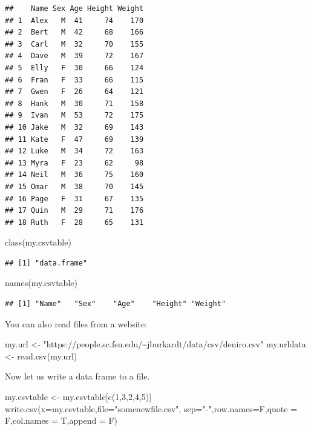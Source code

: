 \documentclass[
]{article}
\newenvironment{Shaded}{\begin{snugshade}}{\end{snugshade}}
\newcommand{\AttributeTok}[1]{\textcolor[rgb]{0.77,0.63,0.00}{#1}}
\newcommand{\DecValTok}[1]{\textcolor[rgb]{0.00,0.00,0.81}{#1}}
\newcommand{\FunctionTok}[1]{\textcolor[rgb]{0.00,0.00,0.00}{#1}}
\newcommand{\NormalTok}[1]{#1}
\newcommand{\OtherTok}[1]{\textcolor[rgb]{0.56,0.35,0.01}{#1}}
\newcommand{\StringTok}[1]{\textcolor[rgb]{0.31,0.60,0.02}{#1}}
\theoremstyle{remark}
\begin{document}
\begin{verbatim}
##    Name Sex Age Height Weight
## 1  Alex   M  41     74    170
## 2  Bert   M  42     68    166
## 3  Carl   M  32     70    155
## 4  Dave   M  39     72    167
## 5  Elly   F  30     66    124
## 6  Fran   F  33     66    115
## 7  Gwen   F  26     64    121
## 8  Hank   M  30     71    158
## 9  Ivan   M  53     72    175
## 10 Jake   M  32     69    143
## 11 Kate   F  47     69    139
## 12 Luke   M  34     72    163
## 13 Myra   F  23     62     98
## 14 Neil   M  36     75    160
## 15 Omar   M  38     70    145
## 16 Page   F  31     67    135
## 17 Quin   M  29     71    176
## 18 Ruth   F  28     65    131
\end{verbatim}

\begin{Shaded}
\begin{Highlighting}[]
\FunctionTok{class}\NormalTok{(my.csvtable)}
\end{Highlighting}
\end{Shaded}

\begin{verbatim}
## [1] "data.frame"
\end{verbatim}

\begin{Shaded}
\begin{Highlighting}[]
\FunctionTok{names}\NormalTok{(my.csvtable)}
\end{Highlighting}
\end{Shaded}

\begin{verbatim}
## [1] "Name"   "Sex"    "Age"    "Height" "Weight"
\end{verbatim}

You can also read files from a website:

\begin{Shaded}
\begin{Highlighting}[]
\NormalTok{ my.url }\OtherTok{\textless{}{-}} \StringTok{"https://people.sc.fsu.edu/\textasciitilde{}jburkardt/data/csv/deniro.csv"}
\NormalTok{ my.urldata }\OtherTok{\textless{}{-}} \FunctionTok{read.csv}\NormalTok{(my.url)}
\end{Highlighting}
\end{Shaded}

Now let us write a data frame to a file.

\begin{Shaded}
\begin{Highlighting}[]
\NormalTok{my.csvtable }\OtherTok{\textless{}{-}}\NormalTok{ my.csvtable[}\FunctionTok{c}\NormalTok{(}\DecValTok{1}\NormalTok{,}\DecValTok{3}\NormalTok{,}\DecValTok{2}\NormalTok{,}\DecValTok{4}\NormalTok{,}\DecValTok{5}\NormalTok{)]}
\FunctionTok{write.csv}\NormalTok{(}\AttributeTok{x=}\NormalTok{my.csvtable,}\AttributeTok{file=}\StringTok{"somenewfile.csv"}\NormalTok{,}
\AttributeTok{sep=}\StringTok{"{-}"}\NormalTok{,}\AttributeTok{row.names=}\NormalTok{F,}\AttributeTok{quote =}\NormalTok{ F,}\AttributeTok{col.names =}\NormalTok{ T,}\AttributeTok{append =}\NormalTok{ F)}
\end{Highlighting}
\end{Shaded}
\end{document}

